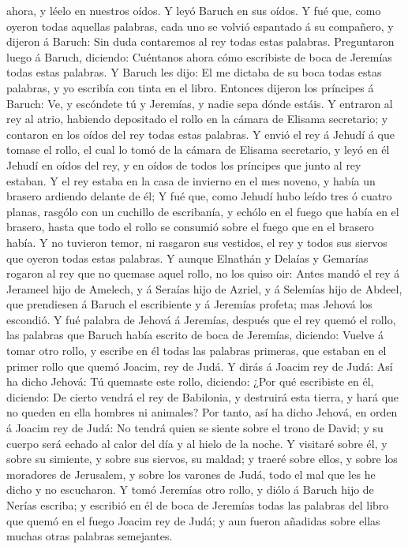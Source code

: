 ahora, y léelo en nuestros oídos. Y leyó Baruch en sus oídos.
 Y fué que, como oyeron todas aquellas palabras, cada uno
se volvió espantado á su compañero, y dijeron á Baruch: Sin duda
contaremos al rey todas estas palabras.  Preguntaron luego
á Baruch, diciendo: Cuéntanos ahora cómo escribiste de boca de Jeremías
todas estas palabras.  Y Baruch les dijo: El me dictaba de
su boca todas estas palabras, y yo escribía con tinta en el libro.
 Entonces dijeron los príncipes á Baruch: Ve, y escóndete
tú y Jeremías, y nadie sepa dónde estáis.  Y entraron al
rey al atrio, habiendo depositado el rollo en la cámara de Elisama
secretario; y contaron en los oídos del rey todas estas palabras.
 Y envió el rey á Jehudí á que tomase el rollo, el cual lo
tomó de la cámara de Elisama secretario, y leyó en él Jehudí en oídos
del rey, y en oídos de todos los príncipes que junto al rey estaban.
 Y el rey estaba en la casa de invierno en el mes noveno, y
había un brasero ardiendo delante de él;  Y fué que, como
Jehudí hubo leído tres ó cuatro planas, rasgólo con un cuchillo de
escribanía, y echólo en el fuego que había en el brasero, hasta que todo
el rollo se consumió sobre el fuego que en el brasero había.
 Y no tuvieron temor, ni rasgaron sus vestidos, el rey y
todos sus siervos que oyeron todas estas palabras.  Y
aunque Elnathán y Delaías y Gemarías rogaron al rey que no quemase aquel
rollo, no los quiso oir:  Antes mandó el rey á Jerameel
hijo de Amelech, y á Seraías hijo de Azriel, y á Selemías hijo de
Abdeel, que prendiesen á Baruch el escribiente y á Jeremías profeta; mas
Jehová los escondió.  Y fué palabra de Jehová á Jeremías,
después que el rey quemó el rollo, las palabras que Baruch había escrito
de boca de Jeremías, diciendo:  Vuelve á tomar otro rollo,
y escribe en él todas las palabras primeras, que estaban en el primer
rollo que quemó Joacim, rey de Judá.  Y dirás á Joacim rey
de Judá: Así ha dicho Jehová: Tú quemaste este rollo, diciendo: ¿Por qué
escribiste en él, diciendo: De cierto vendrá el rey de Babilonia, y
destruirá esta tierra, y hará que no queden en ella hombres ni animales?
 Por tanto, así ha dicho Jehová, en orden á Joacim rey de
Judá: No tendrá quien se siente sobre el trono de David; y su cuerpo
será echado al calor del día y al hielo de la noche.  Y
visitaré sobre él, y sobre su simiente, y sobre sus siervos, su maldad;
y traeré sobre ellos, y sobre los moradores de Jerusalem, y sobre los
varones de Judá, todo el mal que les he dicho y no escucharon.
 Y tomó Jeremías otro rollo, y diólo á Baruch hijo de
Nerías escriba; y escribió en él de boca de Jeremías todas las palabras
del libro que quemó en el fuego Joacim rey de Judá; y aun fueron
añadidas sobre ellas muchas otras palabras semejantes.

